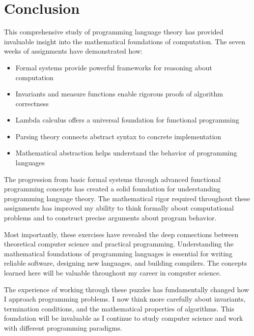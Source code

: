 \documentclass{article}
\theoremstyle{plain}
\theoremstyle{definition}
\theoremstyle{remark}
\begin{document}
\section{Conclusion}\label{conclusion}

This comprehensive study of programming language theory has provided invaluable insight into the mathematical foundations of computation. The seven weeks of assignments have demonstrated how:

\begin{itemize}
\item Formal systems provide powerful frameworks for reasoning about computation
\item Invariants and measure functions enable rigorous proofs of algorithm correctness
\item Lambda calculus offers a universal foundation for functional programming
\item Parsing theory connects abstract syntax to concrete implementation
\item Mathematical abstraction helps understand the behavior of programming languages
\end{itemize}

The progression from basic formal systems through advanced functional programming concepts has created a solid foundation for understanding programming language theory. The mathematical rigor required throughout these assignments has improved my ability to think formally about computational problems and to construct precise arguments about program behavior.

Most importantly, these exercises have revealed the deep connections between theoretical computer science and practical programming. Understanding the mathematical foundations of programming languages is essential for writing reliable software, designing new languages, and building compilers. The concepts learned here will be valuable throughout my career in computer science.

The experience of working through these puzzles has fundamentally changed how I approach programming problems. I now think more carefully about invariants, termination conditions, and the mathematical properties of algorithms. This foundation will be invaluable as I continue to study computer science and work with different programming paradigms.
\end{document}
